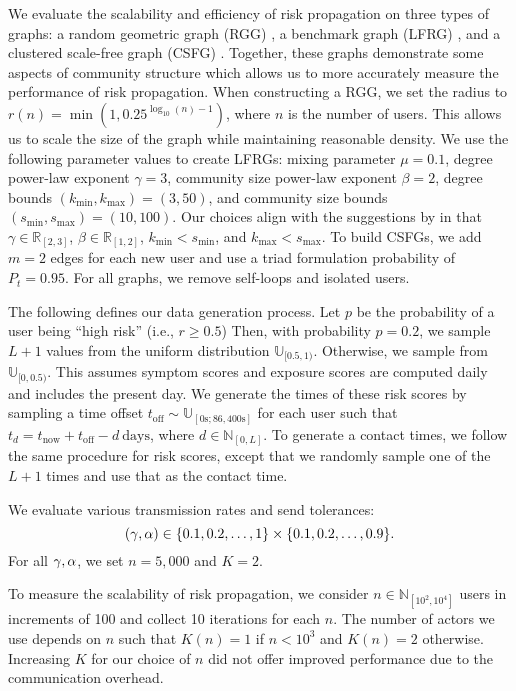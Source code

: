 We evaluate the scalability and efficiency of risk propagation on three types of graphs: a random geometric graph (RGG) \citep{Dall2002}, a benchmark graph (LFRG) \citep{Lancichinetti2008}, and a clustered scale-free graph (CSFG) \citep{Holme2002}. Together, these graphs demonstrate some aspects of community structure \citep{Fortunato2010} which allows us to more accurately measure the performance of risk propagation. When constructing a RGG, we set the radius to $r(n) = \min \left(1, 0.25^{\log_{10}(n) - 1}\right)$, where $n$ is the number of users. This allows us to scale the size of the graph while maintaining reasonable density. We use the following parameter values to create LFRGs: mixing parameter $\mu = 0.1$, degree power-law exponent $\gamma = 3$, community size power-law exponent $\beta = 2$, degree bounds $(k_{\min}, k_{\max}) = (3, 50)$, and community size bounds $(s_{\min}, s_{\max}) = (10, 100)$. Our choices align with the suggestions by \citet{Lancichinetti2008} in that $\gamma \in \mathbb{R}_{[2, 3]}$,  $\beta \in \mathbb{R}_{[1, 2]}$, $k_{\min} < s_{\min}$, and $k_{\max} < s_{\max}$. To build CSFGs, we add $m = 2$ edges for each new user and use a triad formulation probability of $P_t = 0.95$. For all graphs, we remove self-loops and isolated users.

The following defines our data generation process. Let $p$ be the probability of a user being ``high risk'' (i.e., $r \geq 0.5$) Then, with probability $p = 0.2$, we sample $L + 1$ values from the uniform distribution $\mathbb{U}_{[0.5, 1)}$. Otherwise, we sample from $\mathbb{U}_{[0, 0.5)}$. This assumes symptom scores and exposure scores are computed daily and includes the present day. We generate the times of these risk scores by sampling a time offset $t_{\text{off}} \sim \mathbb{U}_{[0\text{s}; 86,400\text{s}]}$ for each user such that $t_d = t_{\text{now}} + t_{\text{off}} - d~\text{days}$, where $d \in \mathbb{N}_{[0, L]}$. To generate a contact times, we follow the same procedure for risk scores, except that we randomly sample one of the $L + 1$ times and use that as the contact time.

We evaluate various transmission rates and send tolerances:
\begin{equation*}
  (\gamma, \alpha) \in \{0.1, 0.2, \ldots, 1\} \times \{0.1, 0.2, \ldots, 0.9\}.
\end{equation*}
For all $\gamma, \alpha$, we set $n = 5,000$ and $K = 2$.

To measure the scalability of risk propagation, we consider $n \in \mathbb{N}_{[10^2, 10^4]}$ users in increments of 100 and collect 10 iterations for each $n$. The number of actors we use depends on $n$ such that $K(n) = 1$ if $n < 10^3$ and $K(n) = 2$ otherwise. Increasing $K$ for our choice of $n$ did not offer improved performance due to the communication overhead.

